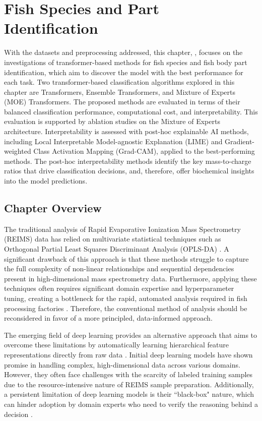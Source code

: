 \chapter{Fish Species and Part Identification}
\label{chapter:fish-species-and-part-identification}

With the datasets and preprocessing addressed, this chapter, , focuses on the investigations of transformer-based methods for fish species and fish body part identification, which aim to discover the model with the best performance for each task. Two transformer-based classification algorithms explored in this chapter are Transformers, Ensemble Transformers, and Mixture of Experts (MOE) Transformers. The proposed methods are evaluated in terms of their balanced classification performance, computational cost, and interpretability. This evaluation is supported by ablation studies on the Mixture of Experts architecture. Interpretability is assessed with post-hoc explainable AI methods, including Local Interpretable Model-agnostic Explanation (LIME) and Gradient-weighted Class Activation Mapping (Grad-CAM), applied to the best-performing methods. The post-hoc interpretability methods identify the key mass-to-charge ratios that drive classification decisions, and, therefore, offer biochemical insights into the model predictions.

\section{Chapter Overview}

The traditional analysis of Rapid Evaporative Ionization Mass Spectrometry (REIMS) data has relied on multivariate statistical techniques such as Orthogonal Partial Least Squares Discriminant Analysis (OPLS-DA) \citep{Bylesjoe2006}. A significant drawback of this approach is that these methods struggle to capture the full complexity of non-linear relationships and sequential dependencies present in high-dimensional mass spectrometry data. Furthermore, applying these techniques often requires significant domain expertise and hyperparameter tuning, creating a bottleneck for the rapid, automated analysis required in fish processing factories \citep{Black2019}. Therefore, the conventional method of analysis should be reconsidered in favor of a more principled, data-informed approach.

The emerging field of deep learning provides an alternative approach that aims to overcome these limitations by automatically learning hierarchical feature representations directly from raw data \citep{Goodfellow2016}. Initial deep learning models have shown promise in handling complex, high-dimensional data across various domains. However, they often face challenges with the scarcity of labeled training samples due to the resource-intensive nature of REIMS sample preparation. Additionally, a persistent limitation of deep learning models is their ``black-box" nature, which can hinder adoption by domain experts who need to verify the reasoning behind a decision \citep{Castelvecchi2016}.

